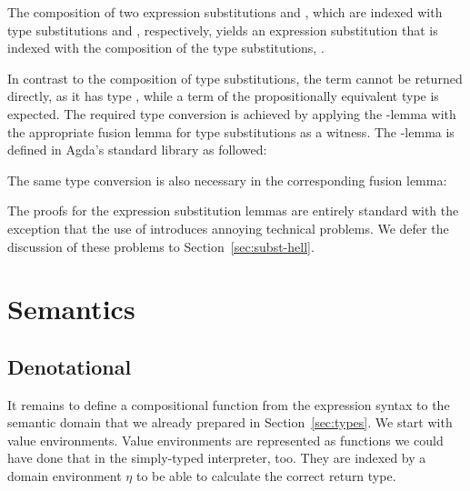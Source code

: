 \documentclass[acmsmall,anonymous,review,screen]{acmart}
\begin{document}


The composition of two expression substitutions  and , which
are indexed with type substitutions  and
, respectively, yields an expression substitution that
is indexed with the composition of the type substitutions,
.
\SubstExamplesECompSS

In contrast to the composition of type substitutions, the term
 cannot be returned directly,
as it has type ,
while a term of the propositionally equivalent type
 is expected.
The required type conversion is achieved by applying the
{\Asubst}-lemma with the appropriate fusion lemma for type
substitutions as a witness. 
The {\Asubst}-lemma is defined in Agda's standard library as
followed:
\SubstExamplesDef

The same type conversion is also necessary in the corresponding fusion lemma:
\SubstExamplesFusionESubESub

The proofs for the expression substitution lemmas are entirely standard with the
exception that the use of {\Asubst} introduces annoying technical problems.
We defer the discussion of these problems to Section~\ref{sec:subst-hell}.


\section{Semantics}
\label{sec:semantics}

\subsection{Denotational}
\label{sec:denotational}



It remains to define a compositional function from the expression
syntax to the semantic domain that we already prepared in
Section~\ref{sec:types}. We start with value environments.
\TFVEnv
Value environments are represented as functions \textemdash{} we could have done
that in the simply-typed interpreter, too. They are indexed by a
domain environment $\eta$ to be able to calculate the correct return type.
\end{document}
